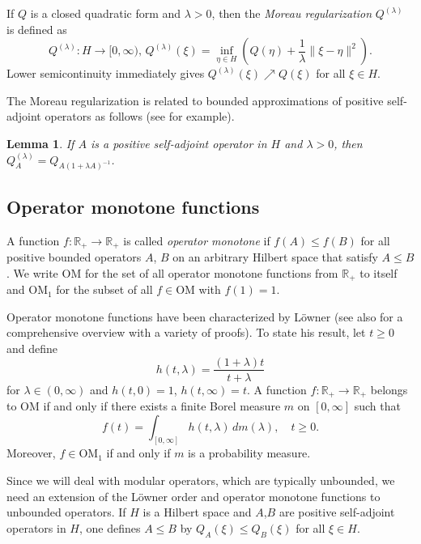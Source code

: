 \documentclass[a4paper,12pt]{amsart}
\newcommand{\norm}[1]{\lVert#1\rVert}
\newcommand{\OM}{\mathrm{OM}}
\newcommand{\IR}{\mathbb R}
\theoremstyle{plain}
\newtheorem{lemma}[proposition]{Lemma}
\theoremstyle{remark}
\theoremstyle{definition}
\begin{document}
If $Q$ is a closed quadratic form and $\lambda>0$, then the \emph{Moreau regularization} $Q^{(\lambda)}$ is defined as
\begin{equation*}
    Q^{(\lambda)}\colon H\to [0,\infty),\,Q^{(\lambda)}(\xi)=\inf_{\eta\in H}(Q(\eta)+\frac 1 \lambda\norm{\xi-\eta}^2).
\end{equation*}
Lower semicontinuity immediately gives $Q^{(\lambda)}(\xi)\nearrow Q(\xi)$ for all $\xi\in H$.

The Moreau regularization is related to bounded approximations of positive self-adjoint operators as follows (see \cite[Section 1.~(i)]{Mos94} for example).

\begin{lemma}\label{lem:Moreau_approx}
    If $A$ is a positive self-adjoint operator in $H$ and $\lambda>0$, then $Q_A^{(\lambda)}=Q_{A(1+\lambda A)^{-1}}$.
\end{lemma}

\subsection{Operator monotone functions}

A function $f\colon \IR_+\to \IR_+$ is called \emph{operator monotone} if $f(A)\leq f(B)$ for all positive bounded operators $A$, $B$ on an arbitrary Hilbert space that satisfy $A\leq B$. We write $\OM$ for the set of all operator monotone functions from $\IR_+$ to itself and $\OM_1$ for the subset of all $f\in\OM$ with $f(1)=1$.

Operator monotone functions have been characterized by Löwner \cite{Low34} (see also \cite{Sim19} for a comprehensive overview with a variety of proofs). To state his result, let $t\geq 0$ and define 
\begin{equation*}
    h(t,\lambda)=\frac{(1+\lambda)t}{t+\lambda}
\end{equation*}
for $\lambda\in (0,\infty)$ and $h(t,0)=1$, $h(t,\infty)=t$. A function $f\colon\IR_+\to\IR_+$ belongs to $\OM$ if and only if there exists a finite Borel measure $m$ on $[0,\infty]$ such that
\begin{equation*}
    f(t)=\int_{[0,\infty]}h(t,\lambda)\,dm(\lambda),\quad t\geq 0.
\end{equation*}
Moreover, $f\in \OM_1$ if and only if $m$ is a probability measure.

Since we will deal with modular operators, which are typically unbounded, we need an extension of the Löwner order and operator monotone functions to unbounded operators. If $H$ is a Hilbert space and $A$,$B$ are positive self-adjoint operators in $H$, one defines $A\leq B$ by $Q_A(\xi)\leq Q_B(\xi)$ for all $\xi\in H$.
\end{document}
